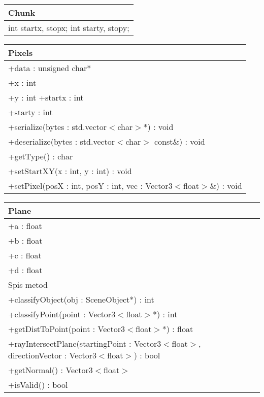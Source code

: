 \begin{center}
    \begin{tabular}{|l|}
    \hline
    Chunk \\ \hline
    int startx, stopx;
    int starty, stopy; 
    \hline
    \end{tabular}
\end{center}


\begin{center}
    \begin{tabular}{|l|}
    \hline
    Pixels \\ \hline
    +data : unsigned char* \\
    +x : int \\
    +y : int
    +startx : int \\
    +starty : int \\
    \hline
	+serialize(bytes : std.vector$<$char$>$*) : void \\
	+deserialize(bytes : std.vector$<$char$>$ const\&) : void \\
	+getType() : char \\
	+setStartXY(x : int, y : int) : void \\
	+setPixel(posX : int, posY : int, vec : Vector3$<$float$>$\&) : void \\
	\hline
    \end{tabular}
\end{center}

\begin{center}
    \begin{tabular}{|l|}
    \hline
    Plane \\ \hline
    +a : float \\ 
    +b : float \\
    +c : float \\
    +d : float \\
    \hline
	Spis metod \\ 
	+classifyObject(obj : SceneObject*) : int \\
	+classifyPoint(point : Vector3$<$float$>$*) : int \\
	+getDistToPoint(point : Vector3$<$float$>$*) : float \\
	+rayIntersectPlane(startingPoint : Vector3$<$float$>$, directionVector : Vector3$<$float$>$) : bool \\
	+getNormal() : Vector3$<$float$>$ \\
	+isValid() : bool \\
	\hline
    \end{tabular}
\end{center}



